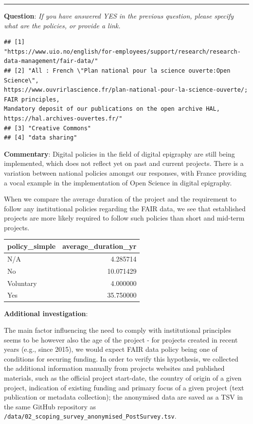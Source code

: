 \documentclass[
  12pt,
]{scrreprt}
\begin{document}
\begin{center}\rule{0.5\linewidth}{0.5pt}\end{center}

\textbf{Question}: \emph{If you have answered YES in the previous
question, please specify what are the policies, or provide a link.}

\begin{verbatim}
## [1]
"https://www.uio.no/english/for-employees/support/research/research-data-management/fair-data/"
## [2] "All : French \"Plan national pour la science ouverte:Open Science\",
https://www.ouvrirlascience.fr/plan-national-pour-la-science-ouverte/; FAIR principles,
Mandatory deposit of our publications on the open archive HAL,
https://hal.archives-ouvertes.fr/"
## [3] "Creative Commons"
## [4] "data sharing"
\end{verbatim}

\textbf{Commentary}: Digital policies in the field of digital epigraphy
are still being implemented, which does not reflect yet on past and
current projects. There is a variation between national policies amongst
our responses, with France providing a vocal example in the
implementation of Open Science in digital epigraphy.

When we compare the average duration of the project and the requirement
to follow any institutional policies regarding the FAIR data, we see
that established projects are more likely required to follow such
policies than short and mid-term projects.

\begin{longtable}[]{@{}lr@{}}
\toprule
policy\_simple & average\_duration\_yr \\
\midrule
\endhead
N/A & 4.285714 \\
No & 10.071429 \\
Voluntary & 4.000000 \\
Yes & 35.750000 \\
\bottomrule
\end{longtable}

\textbf{Additional investigation}:

The main factor influencing the need to comply with institutional
principles seems to be however also the age of the project - for
projects created in recent years (e.g., since 2015), we would expect
FAIR data policy being one of conditions for securing funding. In order
to verify this hypothesis, we collected the additional information
manually from projects websites and published materials, such as the
official project start-date, the country of origin of a given project,
indication of existing funding and primary focus of a given project
(text publication or metadata collection); the anonymised data are saved
as a TSV in the same GitHub repository as
\texttt{/data/02\_scoping\_survey\_anonymised\_PostSurvey.tsv}.
\end{document}
